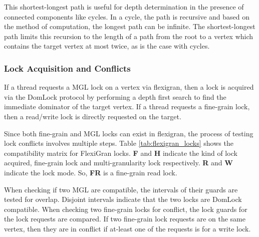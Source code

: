 This shortest-longest path is useful for depth determination in the presence of connected components like cycles. In a cycle, the path is recursive and based on the method of computation, the longest path can be infinite. The shortest-longest path limits this recursion to the length of a path from the root to a vertex which contains the target vertex at most twice, as is the case with cycles. 

\subsubsection{Lock Acquisition and Conflicts}

If a thread requests a MGL lock on a vertex via flexigran, then a lock is acquired via the DomLock protocol by performing a depth first search to find the immediate dominator of the target vertex.
If a thread requests a fine-grain lock, then a read/write lock is directly requested on the target. 

Since both fine-grain and MGL locks can exist in flexigran, the process of testing lock conflicts involves multiple steps. Table \ref{tab:flexigran_locks} shows the compatibility matrix for FlexiGran locks. \textbf{F} and \textbf{H} indicate the kind of lock acquired, fine-grain lock and multi-granularity lock respectively. \textbf{R} and \textbf{W} indicate the lock mode. So, \textbf{FR} is a fine-grain read lock.

When checking if two MGL are compatible, the intervals of their guards are tested for overlap. Disjoint intervals indicate that the two locks are DomLock compatible. When checking two fine-grain locks for conflict, the lock guards for the lock requests are compared. If two fine-grain lock requests are on the same vertex, then they are in conflict if at-least one of the requests is for a write lock.


